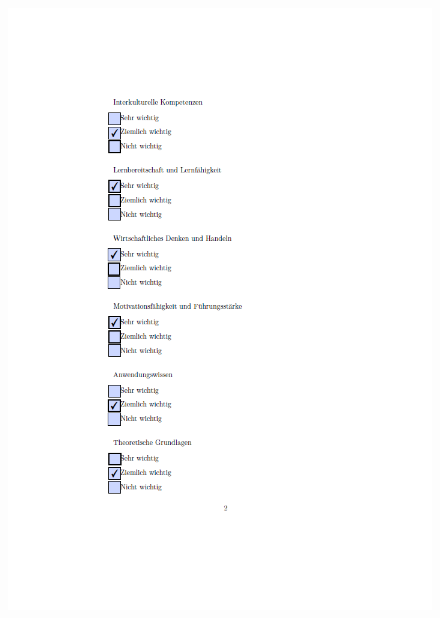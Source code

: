 \begin{figure}[ht]
 	\centering
 	\includegraphics[width=1.3\textwidth]{images/Horat2.png}
 	\label{fig:hor2}
\end{figure}

